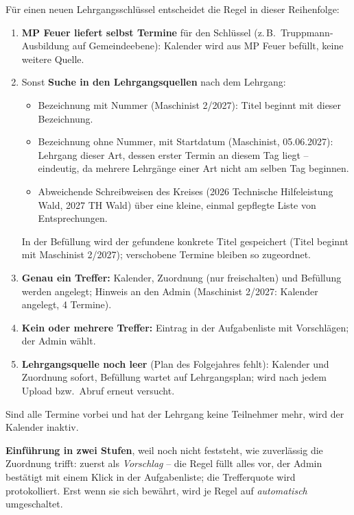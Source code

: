 \documentclass[a4paper,fontsize=10pt]{scrartcl}
\begin{document}
Für einen neuen Lehrgangsschlüssel entscheidet die Regel in dieser Reihenfolge:
\begin{enumerate}
  \item \textbf{MP Feuer liefert selbst Termine} für den Schlüssel (z.\,B.\
        Truppmann-Ausbildung auf Gemeindeebene): Kalender wird aus MP Feuer
        befüllt, keine weitere Quelle.
  \item Sonst \textbf{Suche in den Lehrgangsquellen} nach dem Lehrgang:
    \begin{itemize}
      \item Bezeichnung mit Nummer (\glqq Maschinist 2/2027\grqq): Titel
            beginnt mit dieser Bezeichnung.
      \item Bezeichnung ohne Nummer, mit Startdatum (\glqq Maschinist\grqq,
            05.06.2027): Lehrgang dieser Art, dessen erster Termin an diesem
            Tag liegt -- eindeutig, da mehrere Lehrgänge einer Art nicht am
            selben Tag beginnen.
      \item Abweichende Schreibweisen des Kreises (2026 \glqq Technische
            Hilfeleistung Wald\grqq, 2027 \glqq TH Wald\grqq) über eine
            kleine, einmal gepflegte Liste von Entsprechungen.
    \end{itemize}
        In der Befüllung wird der gefundene konkrete Titel gespeichert
        (\glqq Titel beginnt mit Maschinist 2/2027\grqq); verschobene Termine
        bleiben so zugeordnet.
  \item \textbf{Genau ein Treffer:} Kalender, Zuordnung (nur freischalten) und
        Befüllung werden angelegt; Hinweis an den Admin (\glqq Maschinist
        2/2027: Kalender angelegt, 4 Termine\grqq).
  \item \textbf{Kein oder mehrere Treffer:} Eintrag in der Aufgabenliste mit
        Vorschlägen; der Admin wählt.
  \item \textbf{Lehrgangsquelle noch leer} (Plan des Folgejahres fehlt):
        Kalender und Zuordnung sofort, Befüllung \glqq wartet auf
        Lehrgangsplan\grqq; wird nach jedem Upload bzw.\ Abruf erneut versucht.
\end{enumerate}
Sind alle Termine vorbei und hat der Lehrgang keine Teilnehmer mehr, wird der
Kalender inaktiv.

\textbf{Einführung in zwei Stufen}, weil noch nicht feststeht, wie zuverlässig
die Zuordnung trifft: zuerst als \emph{Vorschlag} -- die Regel füllt alles vor,
der Admin bestätigt mit einem Klick in der Aufgabenliste; die Trefferquote wird
protokolliert. Erst wenn sie sich bewährt, wird je Regel auf \emph{automatisch}
umgeschaltet.
\end{document}
